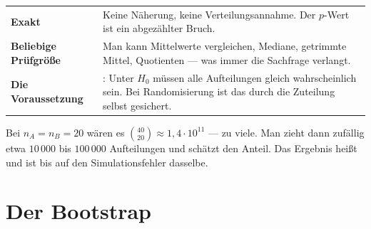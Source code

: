 \begin{merksatz}
\begin{center}
\renewcommand{\arraystretch}{1.55}
\begin{tabular}{@{}P{2.6cm}P{6.0cm}@{}}
\toprule
\textbf{Exakt} & Keine Näherung, keine Verteilungsannahme. Der $p$-Wert ist ein abgezählter Bruch.\\
\textbf{Beliebige Prüfgröße} & Man kann Mittelwerte vergleichen, Mediane, getrimmte Mittel, Quotienten --- was immer die Sachfrage verlangt.\\
\textbf{Die Voraussetzung} & : Unter $H_0$ müssen alle Aufteilungen gleich wahrscheinlich sein. Bei Randomisierung ist das durch die Zuteilung selbst gesichert.\\
\bottomrule
\end{tabular}
\end{center}

\begin{center}
\begin{minipage}{0.88\textwidth}
\end{minipage}
\end{center}

Bei $n_A = n_B = 20$ wären es $\binom{40}{20} \approx 1{,}4 \cdot 10^{11}$ --- zu viele. Man zieht dann zufällig etwa $10\,000$ bis $100\,000$ Aufteilungen und schätzt den Anteil. Das Ergebnis heißt  und ist bis auf den Simulationsfehler dasselbe.
\end{merksatz}

\section{Der Bootstrap}

